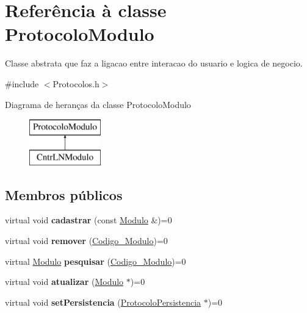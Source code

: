 \hypertarget{class_protocolo_modulo}{
\section{\-Referência à classe \-Protocolo\-Modulo}
\label{class_protocolo_modulo}
}


\-Classe abstrata que faz a ligacao entre interacao do usuario e logica de negocio.  




{\ttfamily \#include $<$\-Protocolos.\-h$>$}

\-Diagrama de heranças da classe \-Protocolo\-Modulo\begin{figure}[H]
\begin{center}
\leavevmode
\includegraphics[height=2.000000cm]{class_protocolo_modulo}
\end{center}
\end{figure}
\subsection*{\-Membros públicos}
\begin{DoxyCompactItemize}
\item 
\hypertarget{class_protocolo_modulo_a806c451fa3191899a1485fc8b1384ea1}{
virtual void {\bfseries cadastrar} (const \hyperlink{class_modulo}{\-Modulo} \&)=0}
\label{class_protocolo_modulo_a806c451fa3191899a1485fc8b1384ea1}

\item 
\hypertarget{class_protocolo_modulo_ad7d56410221ef77347232fa254a0ec03}{
virtual void {\bfseries remover} (\hyperlink{class_codigo___modulo}{\-Codigo\-\_\-\-Modulo})=0}
\label{class_protocolo_modulo_ad7d56410221ef77347232fa254a0ec03}

\item 
\hypertarget{class_protocolo_modulo_ac8dc9878f6d12787b423cd18b7f71ef9}{
virtual \hyperlink{class_modulo}{\-Modulo} {\bfseries pesquisar} (\hyperlink{class_codigo___modulo}{\-Codigo\-\_\-\-Modulo})=0}
\label{class_protocolo_modulo_ac8dc9878f6d12787b423cd18b7f71ef9}

\item 
\hypertarget{class_protocolo_modulo_afe596d0942c2db35a16250521a17f1c9}{
virtual void {\bfseries atualizar} (\hyperlink{class_modulo}{\-Modulo} $\ast$)=0}
\label{class_protocolo_modulo_afe596d0942c2db35a16250521a17f1c9}

\item 
\hypertarget{class_protocolo_modulo_aa64f43a4b1f736fde6ca1bd2dfe9ec59}{
virtual void {\bfseries set\-Persistencia} (\hyperlink{class_protocolo_persistencia}{\-Protocolo\-Persistencia} $\ast$)=0}
\label{class_protocolo_modulo_aa64f43a4b1f736fde6ca1bd2dfe9ec59}

\end{DoxyCompactItemize}


